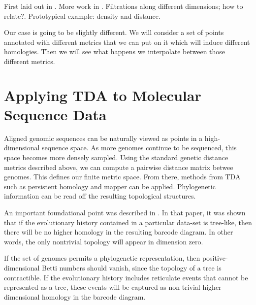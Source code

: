First laid out in \cite{Carlsson:2009b}.
More work in \cite{Lesnick:2012uv}.
Filtrations along different dimensions; how to relate?.
Prototypical example: density and distance.

Our case is going to be slightly different.
We will consider a set of points annotated with different metrics that we can put on it which will induce different homologies.
Then we will see what happens we interpolate between those different metrics.

\section{Applying TDA to Molecular Sequence Data}

Aligned genomic sequences can be naturally viewed as points in a high-dimensional sequence space.
As more genomes continue to be sequenced, this space becomes more densely sampled.
Using the standard genetic distance metrics described above, we can compute a pairwise distance matrix betwee genomes.
This defines our finite metric space.
From there, methods from TDA such as persistent homology and mapper can be applied.
Phylogenetic information can be read off the resulting topological structures.

An important foundational point was described in \cite{Chan:2013}.
In that paper, it was shown that if the evolutionary history contained in a particular data-set is tree-like, then there will be no higher homology in the resulting barcode diagram.
In other words, the only nontrivial topology will appear in dimension zero.

If the set of genomes permits a phylogenetic representation, then positive-dimensional Betti numbers should vanish, since the topology of a tree is contractible. 
If the evolutionary history includes reticulate events that cannot be represented as a tree, these events will be captured as non-trivial higher dimensional homology in the barcode diagram.


